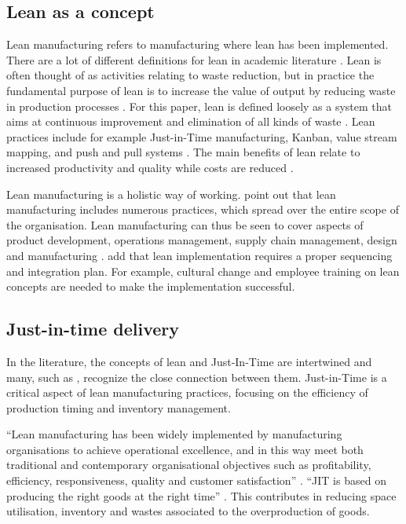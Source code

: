\subsection{Lean as a concept}
Lean manufacturing refers to manufacturing where lean has been implemented. 
There are a lot of different definitions for lean in academic literature \citep{sundarReviewLeanManufacturing2014}. 
Lean is often thought of as activities relating to waste reduction, but in practice the fundamental purpose of lean is to increase the value of output by reducing waste in production processes \citep{sundarReviewLeanManufacturing2014}. 
For this paper, lean is defined loosely as a system that aims at continuous improvement and elimination of all kinds of waste \citep{simpsonUseSupplyRelationship2005}. 
Lean practices include for example Just-in-Time manufacturing, Kanban, value stream mapping, and push and pull systems \citep{sundarReviewLeanManufacturing2014}. 
The main benefits of lean relate to increased productivity and quality while costs are reduced \citep{bhamuLeanManufacturingLiterature2014}.

Lean manufacturing is a holistic way of working. 
\citep{kingLeanGreenEmpirical2009} point out that lean manufacturing includes numerous practices, which spread over the entire scope of the organisation. 
Lean manufacturing can thus be seen to cover aspects of product development, operations management, supply chain management, design and manufacturing \citep{bhamuLeanManufacturingLiterature2014}. 
\citep{sundarReviewLeanManufacturing2014} add that lean implementation requires a proper sequencing and integration plan. 
For example, cultural change and employee training on lean concepts are needed to make the implementation successful.

\subsection{Just-in-time delivery}
In the literature, the concepts of lean and Just-In-Time are intertwined and many, such as \citep{bhamuLeanManufacturingLiterature2014}, \citep{belekoukiasImpactLeanMethods2014} recognize the close connection between them. 
Just-in-Time is a critical aspect of lean manufacturing practices, focusing on the efficiency of production timing and inventory management.

“Lean manufacturing has been widely implemented by manufacturing organisations to achieve operational excellence, and in this way meet both traditional and contemporary organisational objectives such as profitability, efficiency, responsiveness, quality and customer satisfaction” \citep{garza-reyesLeanGreenSystematic2015}. 
“JIT is based on producing the right goods at the right time” \citep{womackLeanThinkingBanish1997}. 
This contributes in reducing space utilisation, inventory and wastes associated to the overproduction of goods.

